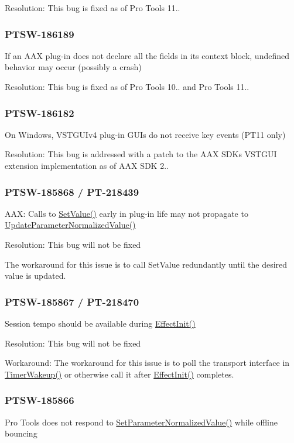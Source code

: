 Resolution\+: This bug is fixed as of Pro Tools 11..\hypertarget{a00846_PTSW-186189}{}\subsubsection{P\+T\+S\+W-\/186189}\label{a00846_PTSW-186189}
If an A\+AX plug-\/in does not declare all the fields in its context block, undefined behavior may occur (possibly a crash)

Resolution\+: This bug is fixed as of Pro Tools 10.. and Pro Tools 11..\hypertarget{a00846_PTSW-186182}{}\subsubsection{P\+T\+S\+W-\/186182}\label{a00846_PTSW-186182}
On Windows, V\+S\+T\+G\+U\+Iv4 plug-\/in G\+U\+Is do not receive key events (P\+T11 only)

Resolution\+: This bug is addressed with a patch to the A\+AX S\+DK\textquotesingle{}s V\+S\+T\+G\+UI extension implementation as of A\+AX S\+DK 2..\hypertarget{a00846_PTSW-185868}{}\subsubsection{P\+T\+S\+W-\/185868 / P\+T-\/218439}\label{a00846_PTSW-185868}
A\+AX\+: Calls to \mbox{\hyperlink{a01537_a4dd6d99de8dc4440bac3ae4eefa19f94}{Set\+Value()}} early in plug-\/in life may not propagate to \mbox{\hyperlink{a01669_a685858711efb8634ce66c327f2865c71}{Update\+Parameter\+Normalized\+Value()}}

Resolution\+: This bug will not be fixed

The workaround for this issue is to call Set\+Value redundantly until the desired value is updated.\hypertarget{a00846_PTSW-185867}{}\subsubsection{P\+T\+S\+W-\/185867 / P\+T-\/218470}\label{a00846_PTSW-185867}
Session tempo should be available during \mbox{\hyperlink{a01481_a2e302fd758d39a6a855023bf825fe148}{Effect\+Init()}}

Resolution\+: This bug will not be fixed

Workaround\+: The workaround for this issue is to poll the transport interface in \mbox{\hyperlink{a01669_ab5b8da9e1a9d778d327ac04f4ab8d139}{Timer\+Wakeup()}} or otherwise call it after \mbox{\hyperlink{a01481_a2e302fd758d39a6a855023bf825fe148}{Effect\+Init()}} completes.\hypertarget{a00846_PTSW-185866}{}\subsubsection{P\+T\+S\+W-\/185866}\label{a00846_PTSW-185866}
Pro Tools does not respond to \mbox{\hyperlink{a01669_a368b0f5a761d1eda4c41b420f153a077}{Set\+Parameter\+Normalized\+Value()}} while offline bouncing

